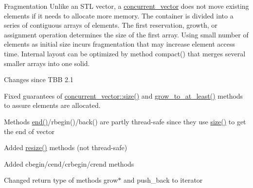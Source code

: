\begin{DoxyParagraph}{Fragmentation}
Unlike an S\+T\+L vector, a \hyperlink{classtbb_1_1concurrent__vector}{concurrent\+\_\+vector} does not move existing elements if it needs to allocate more memory. The container is divided into a series of contiguous arrays of elements. The first reservation, growth, or assignment operation determines the size of the first array. Using small number of elements as initial size incurs fragmentation that may increase element access time. Internal layout can be optimized by method compact() that merges several smaller arrays into one solid.
\end{DoxyParagraph}
\begin{DoxyParagraph}{Changes since T\+B\+B 2.1}

\begin{DoxyItemize}
\item Fixed guarantees of \hyperlink{classtbb_1_1concurrent__vector_a6cac13e24ff09a230f543ff5f523ee7c}{concurrent\+\_\+vector\+::size()} and \hyperlink{classtbb_1_1concurrent__vector_a0318df2adb8e0a9c0af964ca7659e1d6}{grow\+\_\+to\+\_\+at\+\_\+least()} methods to assure elements are allocated.
\item Methods \hyperlink{classtbb_1_1concurrent__vector_a2103c324fe1195d57778df2b4df2a427}{end()}/rbegin()/back() are partly thread-\/safe since they use \hyperlink{classtbb_1_1concurrent__vector_a6cac13e24ff09a230f543ff5f523ee7c}{size()} to get the end of vector
\item Added \hyperlink{classtbb_1_1concurrent__vector_a5dcd05ac1bb8e7e1caea51fd45fa9f92}{resize()} methods (not thread-\/safe)
\item Added cbegin/cend/crbegin/crend methods
\item Changed return type of methods grow$\ast$ and push\+\_\+back to iterator
\end{DoxyItemize}
\end{DoxyParagraph}
